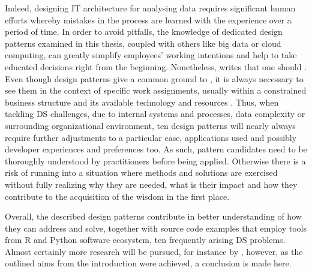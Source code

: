 Indeed, designing \ac{IT} architecture for analysing data requires significant human efforts whereby mistakes in the process are learned with the experience over a period of time. 
In order to avoid pitfalls, the knowledge of dedicated design patterns examined in this thesis, coupled with others like big data or cloud computing, can greatly simplify employees' working intentions and help to take educated decisions right from the beginning. 
Nonetheless, \textcite[13]{Fowler2002} writes that one should . 
Even though design patterns give a common ground to , it is always necessary to see them in the context of specific work assignments, usually within a constrained business structure and its available technology and resources \parencite[389]{GoF2002}.
Thus, when tackling \ac{DS} challenges, due to internal systems and processes, data complexity or surrounding organizational environment, ten design patterns will nearly always require further adjustments to a particular case, applications used and possibly developer experiences and preferences too.
As such, pattern candidates need to be thoroughly understood by practitioners before being applied.
Otherwise there is a risk of running into a situation where methods and solutions are exercised without fully realizing why they are needed, what is their impact and how they contribute to the acquisition of the wisdom in the first place. 

Overall, the described design patterns contribute in better understanding of how they can address and solve, together with source code examples that employ tools from R and Python software ecosystem, ten frequently arising \ac{DS} problems.
Almost certainly more research will be pursued, for instance by \textcite{Todd2019}, however, as the outlined aims from the introduction were achieved, a conclusion is made here.

